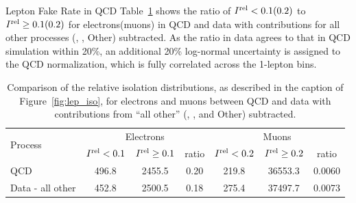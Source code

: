 \begin{section}{Lepton Fake Rate in QCD}
Table~\ref{tab:lep_iso} shows the ratio of $I^{\mathrm{rel}} < 0.1(0.2)$ to $I^{\mathrm{rel}} \geq 0.1(0.2)$ for electrons(muons) in QCD and data with contributions for all other processes (\ttbar, \Wjets, Other) subtracted.
As the ratio in data agrees to that in QCD simulation within 20\%, an additional 20\% log-normal uncertainty is assigned to the QCD normalization, which is fully correlated across the 1-lepton bins.

\begin{table}[h]
\centering
\begin{tabular}{l | cc|c | cc|c }
\hline\hline
\multirow{2}{*}{Process}  &  \multicolumn{3}{c|}{Electrons}                                        &  \multicolumn{3}{c}{Muons}                                        \\
                          &  $I^{\mathrm{rel}} < 0.1$          &  $I^{\mathrm{rel}} \geq 0.1$  & ratio  &  $I^{\mathrm{rel}} < 0.2$      &  $I^{\mathrm{rel}} \geq 0.2$  &  ratio \\
\hline
QCD                       &  496.8                          &  2455.5                    &  0.20  &  219.8                      &  36553.3                   & 0.0060 \\
Data - all other          &  452.8                          &  2500.5                    &  0.18  &  275.4                      &  37497.7                   & 0.0073 \\
\hline\hline
\end{tabular}
\caption{Comparison of the relative isolation distributions, as described in the caption of Figure~\ref{fig:lep_iso}, for electrons and muons between QCD and data with contributions from ``all other'' (\ttbar, \Wjets, and Other) subtracted.}
\label{tab:lep_iso}
\end{table}

\end{section}


